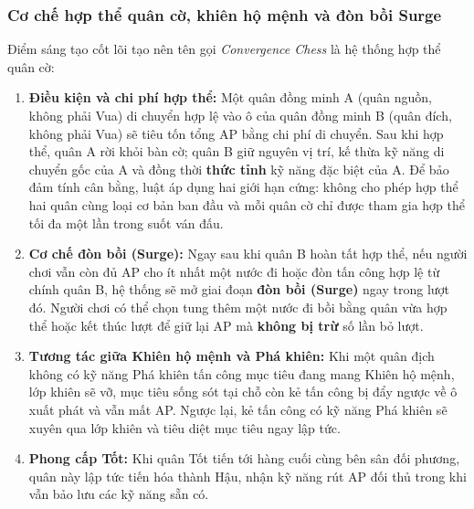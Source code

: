 \subsubsection{Cơ chế hợp thể quân cờ, khiên hộ mệnh và đòn bồi Surge}
Điểm sáng tạo cốt lõi tạo nên tên gọi \textit{Convergence Chess} là hệ thống hợp thể quân cờ:
\begin{enumerate}
    \item \textbf{Điều kiện và chi phí hợp thể:} Một quân đồng minh A (quân nguồn, không phải Vua) di chuyển hợp lệ vào ô của quân đồng minh B (quân đích, không phải Vua) sẽ tiêu tốn tổng AP bằng chi phí di chuyển. Sau khi hợp thể, quân A rời khỏi bàn cờ; quân B giữ nguyên vị trí, kế thừa kỹ năng di chuyển gốc của A và đồng thời \textbf{thức tỉnh} kỹ năng đặc biệt của A. Để bảo đảm tính cân bằng, luật áp dụng hai giới hạn cứng: không cho phép hợp thể hai quân cùng loại cơ bản ban đầu và mỗi quân cờ chỉ được tham gia hợp thể tối đa một lần trong suốt ván đấu.
    \item \textbf{Cơ chế đòn bồi (Surge):} Ngay sau khi quân B hoàn tất hợp thể, nếu người chơi vẫn còn đủ AP cho ít nhất một nước đi hoặc đòn tấn công hợp lệ từ chính quân B, hệ thống sẽ mở giai đoạn \textbf{đòn bồi (Surge)} ngay trong lượt đó. Người chơi có thể chọn tung thêm một nước đi bồi bằng quân vừa hợp thể hoặc kết thúc lượt để giữ lại AP mà \textbf{không bị trừ} số lần bỏ lượt.
    \item \textbf{Tương tác giữa Khiên hộ mệnh và Phá khiên:} Khi một quân địch không có kỹ năng Phá khiên tấn công mục tiêu đang mang Khiên hộ mệnh, lớp khiên sẽ vỡ, mục tiêu sống sót tại chỗ còn kẻ tấn công bị đẩy ngược về ô xuất phát và vẫn mất AP. Ngược lại, kẻ tấn công có kỹ năng Phá khiên sẽ xuyên qua lớp khiên và tiêu diệt mục tiêu ngay lập tức.
    \item \textbf{Phong cấp Tốt:} Khi quân Tốt tiến tới hàng cuối cùng bên sân đối phương, quân này lập tức tiến hóa thành Hậu, nhận kỹ năng rút AP đối thủ trong khi vẫn bảo lưu các kỹ năng sẵn có.
\end{enumerate}

